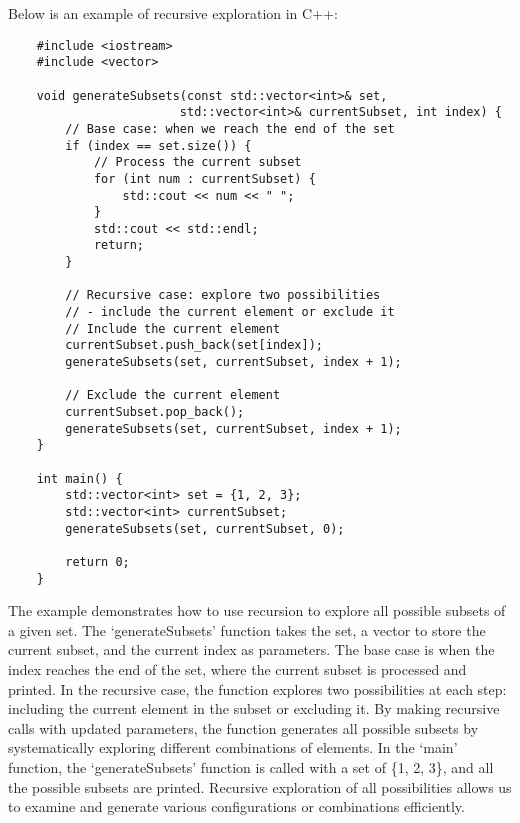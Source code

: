 \begin{solution}
    Below is an example of recursive exploration in C++:

    \horizontalline

    \begin{verbatim}
    #include <iostream>
    #include <vector>
    
    void generateSubsets(const std::vector<int>& set, 
                        std::vector<int>& currentSubset, int index) {
        // Base case: when we reach the end of the set
        if (index == set.size()) {
            // Process the current subset
            for (int num : currentSubset) {
                std::cout << num << " ";
            }
            std::cout << std::endl;
            return;
        }
    
        // Recursive case: explore two possibilities 
        // - include the current element or exclude it
        // Include the current element
        currentSubset.push_back(set[index]);
        generateSubsets(set, currentSubset, index + 1);
    
        // Exclude the current element
        currentSubset.pop_back();
        generateSubsets(set, currentSubset, index + 1);
    }
    
    int main() {
        std::vector<int> set = {1, 2, 3};
        std::vector<int> currentSubset;
        generateSubsets(set, currentSubset, 0);
    
        return 0;
    }
    \end{verbatim}

    \horizontalline

    The example demonstrates how to use recursion to explore all possible subsets of a given set. The `generateSubsets' function takes the set, a vector to store the current subset, and the current index as parameters. The base case is when the index reaches the end of the set, where the current subset is processed and printed. 
    In the recursive case, the function explores two possibilities at each step: including the current element in the subset or excluding it. By making recursive calls with updated parameters, the function generates all possible subsets by systematically exploring different combinations of elements. In the `main' function, the 
    `generateSubsets' function is called with a set of \{1, 2, 3\}, and all the possible subsets are printed. Recursive exploration of all possibilities allows us to examine and generate various configurations or combinations efficiently.
\end{solution}

